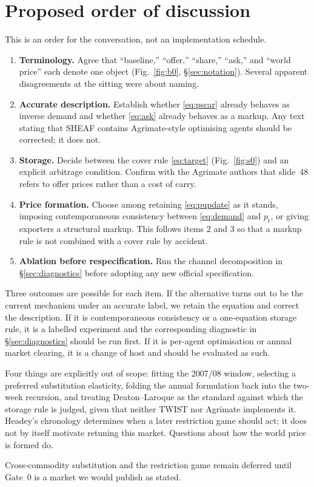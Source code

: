 \section{Proposed order of discussion}
\label{sec:order}

This is an order for the conversation, not an implementation schedule.

\begin{enumerate}
\item \textbf{Terminology.} Agree that ``baseline,'' ``offer,'' ``share,''
      ``ask,'' and ``world price'' each denote one object
      (Fig.~\ref{fig:b0}, \S\ref{sec:notation}). Several apparent
      disagreements at the sitting were about naming.
\item \textbf{Accurate description.} Establish whether \eqref{eq:pscar}
      already behaves as inverse demand and whether \eqref{eq:ask} already
      behaves as a markup. Any text stating that SHEAF contains
      Agrimate-style optimising agents should be corrected; it does not.
\item \textbf{Storage.} Decide between the cover rule \eqref{eq:target}
      (Fig.~\ref{fig:s0}) and an explicit arbitrage condition. Confirm
      with the Agrimate authors that slide~48 refers to offer prices
      rather than a cost of carry.
\item \textbf{Price formation.} Choose among retaining
      \eqref{eq:pupdate} as it stands, imposing contemporaneous
      consistency between \eqref{eq:demand} and \(p_t\), or giving
      exporters a structural markup. This follows items 2 and 3 so that a
      markup rule is not combined with a cover rule by accident.
\item \textbf{Ablation before respecification.} Run the channel
      decomposition in \S\ref{sec:diagnostics} before adopting any new
      official specification.
\end{enumerate}

Three outcomes are possible for each item. If the alternative turns out to
be the current mechanism under an accurate label, we retain the equation
and correct the description. If it is contemporaneous consistency or a
one-equation storage rule, it is a labelled experiment and the
corresponding diagnostic in \S\ref{sec:diagnostics} should be run first.
If it is per-agent optimisation or annual market clearing, it is a change
of host and should be evaluated as such.

Four things are explicitly out of scope: fitting the 2007/08 window,
selecting a preferred substitution elasticity, folding the annual
formulation back into the two-week recursion, and treating
Deaton--Laroque \citep{deaton1992} as the standard against which the
storage rule is judged, given that neither TWIST \citep{schewe2017} nor
Agrimate \citep{kuhla2025} implements it. Headey's chronology
\citep{headey2011} determines when a later restriction game should act; it
does not by itself motivate retuning this market. Questions about how the
world price is formed do.

Cross-commodity substitution and the restriction game remain deferred
until Gate~0 is a market we would publish as stated.
